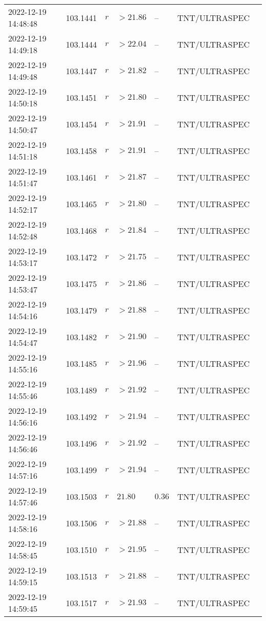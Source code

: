 \documentclass{nature_plusfigure}
\begin{document}
\begin{supplement}
\begin{center}
\begin{longtable}{lllllll}
2022-12-19 14:48:48 & 103.1441 & $r$ & $>21.86$ & -- & TNT/ULTRASPEC &  \\ 
2022-12-19 14:49:18 & 103.1444 & $r$ & $>22.04$ & -- & TNT/ULTRASPEC &  \\ 
2022-12-19 14:49:48 & 103.1447 & $r$ & $>21.82$ & -- & TNT/ULTRASPEC &  \\ 
2022-12-19 14:50:18 & 103.1451 & $r$ & $>21.80$ & -- & TNT/ULTRASPEC &  \\ 
2022-12-19 14:50:47 & 103.1454 & $r$ & $>21.91$ & -- & TNT/ULTRASPEC &  \\ 
2022-12-19 14:51:18 & 103.1458 & $r$ & $>21.91$ & -- & TNT/ULTRASPEC &  \\ 
2022-12-19 14:51:47 & 103.1461 & $r$ & $>21.87$ & -- & TNT/ULTRASPEC &  \\ 
2022-12-19 14:52:17 & 103.1465 & $r$ & $>21.80$ & -- & TNT/ULTRASPEC &  \\ 
2022-12-19 14:52:48 & 103.1468 & $r$ & $>21.84$ & -- & TNT/ULTRASPEC &  \\ 
2022-12-19 14:53:17 & 103.1472 & $r$ & $>21.75$ & -- & TNT/ULTRASPEC &  \\ 
2022-12-19 14:53:47 & 103.1475 & $r$ & $>21.86$ & -- & TNT/ULTRASPEC &  \\ 
2022-12-19 14:54:16 & 103.1479 & $r$ & $>21.88$ & -- & TNT/ULTRASPEC &  \\ 
2022-12-19 14:54:47 & 103.1482 & $r$ & $>21.90$ & -- & TNT/ULTRASPEC &  \\ 
2022-12-19 14:55:16 & 103.1485 & $r$ & $>21.96$ & -- & TNT/ULTRASPEC &  \\ 
2022-12-19 14:55:46 & 103.1489 & $r$ & $>21.92$ & -- & TNT/ULTRASPEC &  \\ 
2022-12-19 14:56:16 & 103.1492 & $r$ & $>21.94$ & -- & TNT/ULTRASPEC &  \\ 
2022-12-19 14:56:46 & 103.1496 & $r$ & $>21.92$ & -- & TNT/ULTRASPEC &  \\ 
2022-12-19 14:57:16 & 103.1499 & $r$ & $>21.94$ & -- & TNT/ULTRASPEC &  \\ 
2022-12-19 14:57:46 & 103.1503 & $r$ & $21.80$ & $0.36$ & TNT/ULTRASPEC &  \\ 
2022-12-19 14:58:16 & 103.1506 & $r$ & $>21.88$ & -- & TNT/ULTRASPEC &  \\ 
2022-12-19 14:58:45 & 103.1510 & $r$ & $>21.95$ & -- & TNT/ULTRASPEC &  \\ 
2022-12-19 14:59:15 & 103.1513 & $r$ & $>21.88$ & -- & TNT/ULTRASPEC &  \\ 
2022-12-19 14:59:45 & 103.1517 & $r$ & $>21.93$ & -- & TNT/ULTRASPEC &  \\ 

\end{longtable}
\end{center}
\end{supplement}
\end{document}
